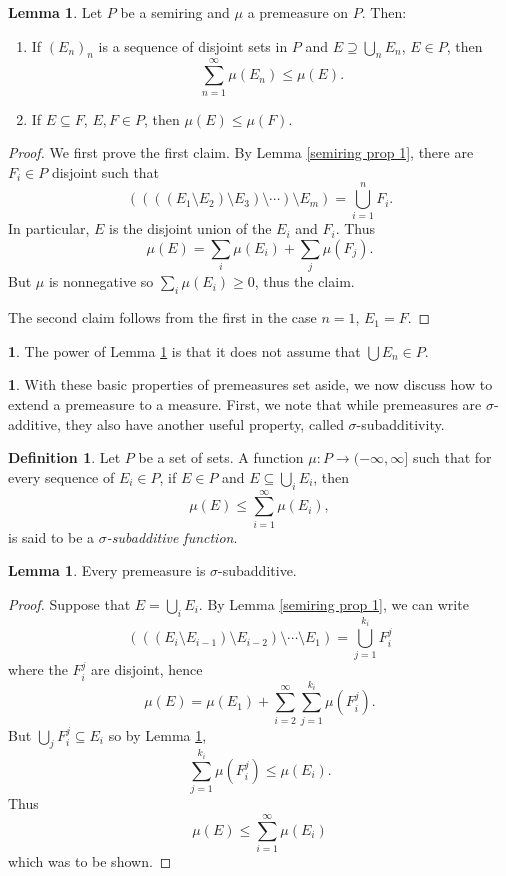 \documentclass[12pt]{book}
\newcommand{\dfn}[1]{\emph{#1}\index{#1}}
\theoremstyle{definition}
\newtheorem{lemma}[theorem]{Lemma}
\newtheorem{subsec}[theorem]{}
\newtheorem{definition}[theorem]{Definition}
\begin{document}
\begin{lemma}
\label{semiring prop 2}
Let $P$ be a semiring and $\mu$ a premeasure on $P$. Then:
\begin{enumerate}
\item If $(E_n)_n$ is a sequence of disjoint sets in $P$ and $E \supseteq \bigcup_n E_n$, $E \in P$, then
$$\sum_{n=1}^\infty \mu(E_n) \leq \mu(E).$$
\item If $E \subseteq F$, $E, F \in P$, then $\mu(E) \leq \mu(F)$.
\end{enumerate}
\end{lemma}
\begin{proof}
We first prove the first claim. By Lemma \ref{semiring prop 1}, there are $F_i \in P$ disjoint such that
$$((((E_1 \setminus E_2) \setminus E_3) \setminus \cdots) \setminus E_m) = \bigcup_{i=1}^n F_i.$$
In particular, $E$ is the disjoint union of the $E_i$ and $F_i$. Thus
$$\mu(E) = \sum_i \mu(E_i) + \sum_j \mu(F_j).$$
But $\mu$ is nonnegative so $\sum_i \mu(E_i) \geq 0$, thus the claim.

The second claim follows from the first in the case $n = 1$, $E_1 = F$.
\end{proof}

\begin{subsec}
The power of Lemma \ref{semiring prop 2} is that it does not assume that $\bigcup E_n \in P$.
\end{subsec}

\begin{subsec}
With these basic properties of premeasures set aside, we now discuss how to extend a premeasure to a measure.
First, we note that while premeasures are $\sigma$-additive, they also have another useful property, called $\sigma$-subadditivity.
\end{subsec}

\begin{definition}
Let $P$ be a set of sets. A function $\mu: P \to (-\infty, \infty]$ such that for every sequence of $E_i \in P$, if $E \in P$ and $E \subseteq \bigcup_i E_i$, then
$$\mu(E) \leq \sum_{i=1}^\infty \mu(E_i),$$
is said to be a \dfn{$\sigma$-subadditive function}.
\end{definition}

\begin{lemma}
Every premeasure is $\sigma$-subadditive.
\end{lemma}
\begin{proof}
Suppose that $E = \bigcup_i E_i$. By Lemma \ref{semiring prop 1}, we can write
$$(((E_i \setminus E_{i-1}) \setminus E_{i-2}) \setminus \cdots \setminus E_1) = \bigcup_{j=1}^{k_i} F_i^j$$
where the $F_i^j$ are disjoint, hence
$$\mu(E) = \mu(E_1) + \sum_{i=2}^\infty \sum_{j=1}^{k_i} \mu(F_i^j).$$
But $\bigcup_j F_i^j \subseteq E_i$ so by Lemma \ref{semiring prop 2},
$$\sum_{j=1}^{k_i} \mu(F_i^j) \leq \mu(E_i).$$
Thus
$$\mu(E) \leq \sum_{i=1}^\infty \mu(E_i)$$
which was to be shown.
\end{proof}
\end{document}
